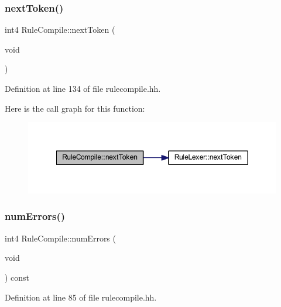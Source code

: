 \mbox{\label{class_rule_compile_a38d561337771aa620c8bb1fd26f3f12b}} 
\subsubsection{\texorpdfstring{nextToken()}{nextToken()}}
{\footnotesize\ttfamily int4 Rule\+Compile\+::next\+Token (\begin{DoxyParamCaption}\item[{void}]{ }\end{DoxyParamCaption})\hspace{0.3cm}{\ttfamily [inline]}}



Definition at line 134 of file rulecompile.\+hh.

Here is the call graph for this function\+:
\nopagebreak
\begin{figure}[H]
\begin{center}
\leavevmode
\includegraphics[width=349pt]{class_rule_compile_a38d561337771aa620c8bb1fd26f3f12b_cgraph}
\end{center}
\end{figure}
\mbox{\label{class_rule_compile_a7bcbc0231f0c9110abcbf84dd3ebfdde}} 
\subsubsection{\texorpdfstring{numErrors()}{numErrors()}}
{\footnotesize\ttfamily int4 Rule\+Compile\+::num\+Errors (\begin{DoxyParamCaption}\item[{void}]{ }\end{DoxyParamCaption}) const\hspace{0.3cm}{\ttfamily [inline]}}



Definition at line 85 of file rulecompile.\+hh.

